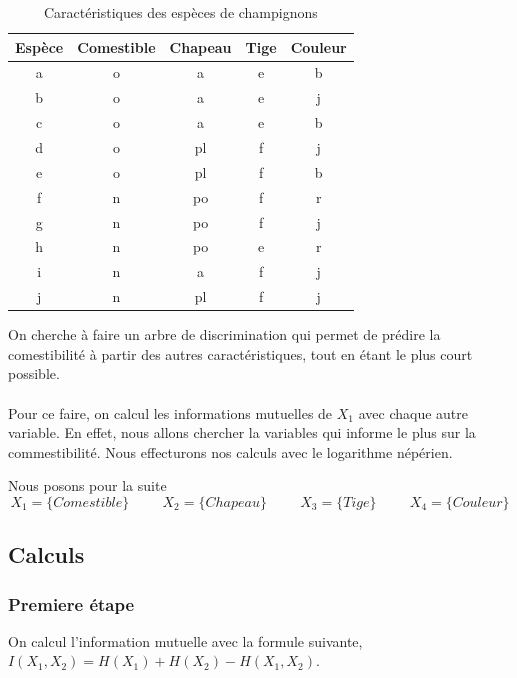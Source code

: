\documentclass{article}
\begin{document}
\begin{table}[h]
  \centering
  \caption{Caractéristiques des espèces de champignons}
  \begin{tabular}{@{}ccccc@{}}
  \toprule
  Espèce & Comestible & Chapeau & Tige & Couleur \\ \midrule
  a      & o          & a       & e    & b       \\
  b      & o          & a       & e    & j       \\
  c      & o          & a       & e    & b       \\
  d      & o          & pl      & f    & j       \\
  e      & o          & pl      & f    & b       \\
  f      & n          & po      & f    & r       \\
  g      & n          & po      & f    & j       \\
  h      & n          & po      & e    & r       \\
  i      & n          & a       & f    & j       \\
  j      & n          & pl      & f    & j       \\ \bottomrule
  \end{tabular}
  
  \label{tab:champignons}
  \end{table}

  On cherche à faire un arbre de discrimination qui permet de prédire la comestibilité à partir des autres caractéristiques, tout en étant le plus court possible.
  \\
  \\
  Pour ce faire, on calcul les informations mutuelles de $X_1$ avec chaque autre variable.
  En effet, nous allons chercher la variables qui informe le plus sur la commestibilité. Nous effecturons nos calculs avec le logarithme népérien.

Nous posons pour la suite
\[
X_1 = \{Comestible\} \hspace{1cm} X_2 = \{Chapeau\} \hspace{1cm} X_3 = \{Tige\} \hspace{1cm} X_4 = \{Couleur\}
\]

\subsection{Calculs}

\subsubsection{Premiere étape}
On calcul l'information mutuelle avec la formule suivante, $I(X_1,X_2) = H(X_1) + H(X_2) - H(X_1,X_2)$.
\end{document}
